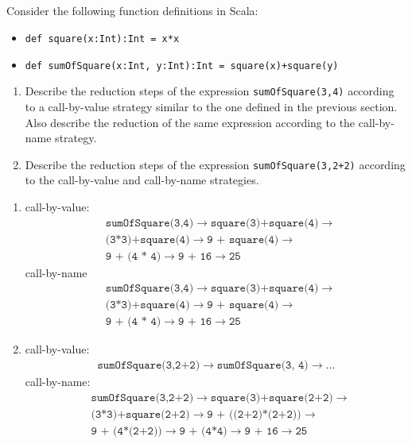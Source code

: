 \subsection{}

Consider the following function definitions in Scala:
\begin{itemize}
	\item \texttt{def square(x:Int):Int = x*x}
	\item \texttt{def sumOfSquare(x:Int, y:Int):Int = square(x)+square(y)}
\end{itemize}
\begin{enumerate}
	\item Describe the reduction steps of the expression \texttt{sumOfSquare(3,4)}
	      according to a call-by-value strategy similar to the one defined in the
	      previous section. Also describe the reduction of the same expression
	      according to the call-by-name strategy.
	\item Describe the reduction steps of the expression
	      \texttt{sumOfSquare(3,2+2)} according to the call-by-value and
	      call-by-name strategies.
\end{enumerate}
\begin{enumerate}
	\item call-by-value:
	      \begin{align*}
		       & \texttt{sumOfSquare(3,4)} \to \texttt{square(3)+square(4)} \to \\
		       & \texttt{(3*3)+square(4)} \to \texttt{9 + square(4)} \to        \\
		       & \texttt{9 + (4 * 4)} \to \texttt{9 + 16} \to \texttt{25}
	      \end{align*}
	      call-by-name
	      \begin{align*}
		       & \texttt{sumOfSquare(3,4)} \to \texttt{square(3)+square(4)} \to \\
		       & \texttt{(3*3)+square(4)} \to \texttt{9 + square(4)} \to        \\
		       & \texttt{9 + (4 * 4)} \to \texttt{9 + 16} \to \texttt{25}
	      \end{align*}
	\item call-by-value:
	      \begin{align*}
		      \texttt{sumOfSquare(3,2+2)} \to \texttt{sumOfSquare(3, 4)} \to ...
	      \end{align*}
	      call-by-name:
	      \begin{align*}
		       & \texttt{sumOfSquare(3,2+2)} \to \texttt{square(3)+square(2+2)} \to                \\
		       & \texttt{(3*3)+square(2+2)} \to \texttt{9 + ((2+2)*(2+2))} \to                     \\
		       & \texttt{9 + (4*(2+2))} \to \texttt{9 + (4*4)} \to \texttt{9 + 16} \to \texttt{25}
	      \end{align*}
\end{enumerate}
